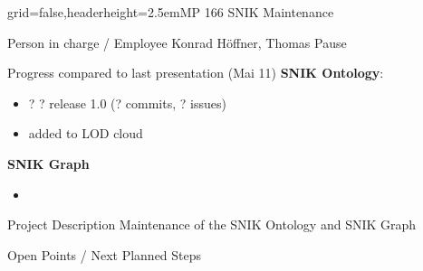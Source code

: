 \documentclass[english]{kiesgrube}
\begin{document}

\newpage

\begin{poster}{grid=false,headerheight=2.5em}{}{MP 166 SNIK Maintenance}{}{}
\begin{posterbox}[name=person,column=0,row=0]{Person in charge / Employee}
Konrad Höffner, Thomas Pause
\end{posterbox}
\begin{posterbox}[name=progress,below=person]{Progress compared to last presentation (Mai 11)}
\textbf{SNIK Ontology}:
\begin{itemize}
\item ? ? release 1.0 (? commits, ? issues)
\item added to LOD cloud
\end{itemize}
\textbf{SNIK Graph}
\begin{itemize}
\item 
\end{itemize}
\end{posterbox}
\begin{posterbox}[name=description,column=1,row=0]{Project Description}
Maintenance of the SNIK Ontology and SNIK Graph
\end{posterbox}
\begin{posterbox}[name=open,column=1,below=description]{Open Points / Next Planned Steps}
\end{posterbox}

\end{poster}
\end{document}
